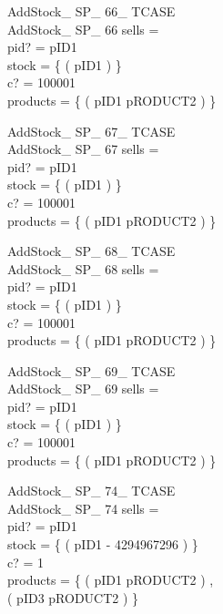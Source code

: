 \begin{schema}{AddStock\_ SP\_ 66\_ TCASE}\\
AddStock\_ SP\_ 66
\where
sells =~\emptyset \\
pid? = pID1 \\
stock = \{ ( pID1  ) \} \\
c? = 100001 \\
products = \{ ( pID1 \mapsto pRODUCT2 ) \}
\end{schema}


\begin{schema}{AddStock\_ SP\_ 67\_ TCASE}\\
AddStock\_ SP\_ 67
\where
sells =~\emptyset \\
pid? = pID1 \\
stock = \{ ( pID1  ) \} \\
c? = 100001 \\
products = \{ ( pID1 \mapsto pRODUCT2 ) \}
\end{schema}


\begin{schema}{AddStock\_ SP\_ 68\_ TCASE}\\
AddStock\_ SP\_ 68
\where
sells =~\emptyset \\
pid? = pID1 \\
stock = \{ ( pID1  ) \} \\
c? = 100001 \\
products = \{ ( pID1 \mapsto pRODUCT2 ) \}
\end{schema}


\begin{schema}{AddStock\_ SP\_ 69\_ TCASE}\\
AddStock\_ SP\_ 69
\where
sells =~\emptyset \\
pid? = pID1 \\
stock = \{ ( pID1  ) \} \\
c? = 100001 \\
products = \{ ( pID1 \mapsto pRODUCT2 ) \}
\end{schema}


\begin{schema}{AddStock\_ SP\_ 74\_ TCASE}\\
AddStock\_ SP\_ 74
\where
sells =~\emptyset \\
pid? = pID1 \\
stock = \{ ( pID1 \mapsto - 4294967296 ) \} \\
c? = 1 \\
products = \{ ( pID1 \mapsto pRODUCT2 ) , \\ ( pID3 \mapsto pRODUCT2 ) \}
\end{schema}


